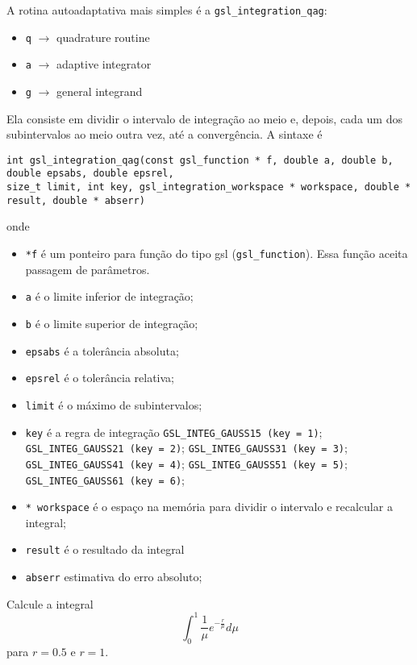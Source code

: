 A rotina autoadaptativa mais simples é a \verb|gsl_integration_qag|:
\begin{itemize}
 \item \verb|q| $\rightarrow$ quadrature routine
 \item \verb|a| $\rightarrow$ adaptive integrator
 \item \verb|g| $\rightarrow$ general integrand
\end{itemize}
Ela consiste em dividir o intervalo de integração ao meio e, depois, cada um dos subintervalos ao meio outra vez, até a convergência. A sintaxe é
\begin{verbatim}
int gsl_integration_qag(const gsl_function * f, double a, double b, double epsabs, double epsrel, 
size_t limit, int key, gsl_integration_workspace * workspace, double * result, double * abserr)
\end{verbatim}
onde
\begin{itemize}
\item \verb|*f| é um ponteiro para função do tipo gsl (\verb|gsl_function|). Essa função aceita passagem de parâmetros.
 \item \verb|a| é o limite inferior de integração;
  \item \verb|b| é o limite superior de integração;
 \item \verb|epsabs| é a tolerância absoluta;
 \item \verb|epsrel| é o tolerância relativa;
 \item \verb|limit| é o máximo de subintervalos;
 \item \verb|key| é a regra de integração
 \subitem \verb|GSL_INTEG_GAUSS15 (key = 1)|;
 \subitem \verb|GSL_INTEG_GAUSS21 (key = 2)|;
 \subitem \verb|GSL_INTEG_GAUSS31 (key = 3)|;
 \subitem \verb|GSL_INTEG_GAUSS41 (key = 4)|;
 \subitem \verb|GSL_INTEG_GAUSS51 (key = 5)|;
 \subitem \verb|GSL_INTEG_GAUSS61 (key = 6)|;
 \item \verb|* workspace| é o espaço na memória para dividir o intervalo e recalcular a integral; 
 \item \verb|result| é o resultado da integral
 \item \verb|abserr| estimativa do erro absoluto;
\end{itemize}
\begin{ex}\label{ex_gls_int}
Calcule a integral
$$
\int_0^1\frac{1}{\mu}e^{-\frac{r}{\mu} }d\mu 
$$
para $r=0.5$ e $r=1$.
\end{ex}
